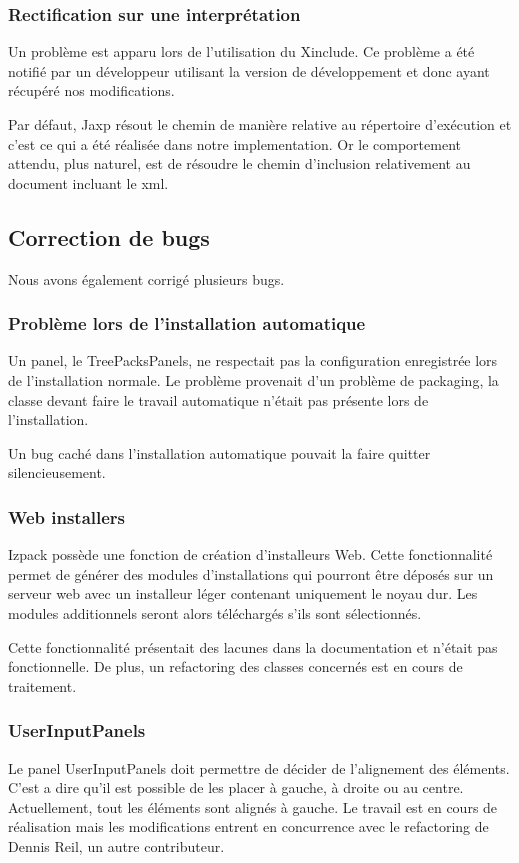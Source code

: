 \subsubsection{Rectification sur une interprétation}
Un problème est apparu lors de l'utilisation du Xinclude.
Ce problème a été notifié par un développeur utilisant la version de développement et donc ayant récupéré nos modifications.

Par défaut, Jaxp résout le chemin de manière relative au répertoire d'exécution et c'est ce qui a été réalisée dans notre implementation.
Or le comportement attendu, plus naturel, est de résoudre le chemin d'inclusion relativement au document incluant le xml.

\subsection{Correction de bugs}
Nous avons également corrigé plusieurs bugs.
\subsubsection{Problème lors de l'installation automatique}
Un panel, le TreePacksPanels, ne respectait pas la configuration enregistrée lors de l'installation normale. 
Le problème provenait d'un problème de packaging, la classe devant faire le travail automatique n'était pas présente lors de l'installation.

Un bug caché dans l'installation automatique pouvait la faire quitter silencieusement.
\subsubsection{Web installers}
Izpack possède une fonction de création d'installeurs Web.
Cette fonctionnalité permet de générer des modules d'installations qui pourront être déposés sur un serveur web avec un installeur léger contenant uniquement le noyau dur.
Les modules additionnels seront alors téléchargés s'ils sont sélectionnés.

Cette fonctionnalité présentait des lacunes dans la documentation et n'était pas fonctionnelle.
De plus, un refactoring des classes concernés est en cours de traitement.
\subsubsection{UserInputPanels}
Le panel UserInputPanels doit permettre de décider de l'alignement des éléments.
C'est a dire qu'il est possible de les placer à gauche, à droite ou au centre. Actuellement, tout les éléments sont alignés à gauche.
Le travail est en cours de réalisation mais les modifications entrent en concurrence avec le refactoring de Dennis Reil, un autre contributeur.

